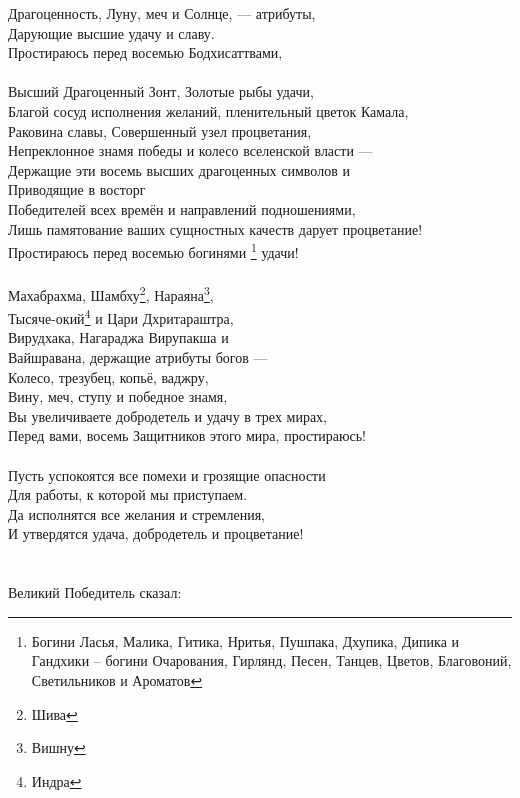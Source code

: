 Драгоценность, Луну, меч и Солнце, — атрибуты,\\
Дарующие высшие удачу и славу.\\
Простираюсь перед восемью Бодхисаттвами, \\
\\
Высший Драгоценный Зонт, Золотые рыбы удачи,\\
Благой сосуд исполнения желаний, пленительный цветок Камала,\\
Раковина славы, Совершенный узел процветания,\\
Непреклонное знамя победы и колесо вселенской власти —\\
Держащие эти восемь высших драгоценных символов  и\\
Приводящие в восторг \\ \indent Победителей всех времён и направлений подношениями,\\
Лишь памятование ваших сущностных качеств дарует процветание!\\
Простираюсь перед восемью богинями
\footnote{ Богини Ласья, Малика, Гитика, Нритья, Пушпака, 
           Дхупика, Дипика и Гандхики – богини Очарования, 
           Гирлянд, Песен, Танцев, Цветов, Благовоний, 
           Светильников и Ароматов} удачи! \\
\\
Махабрахма, Шамбху\footnote{Шива}, Нараяна\footnote{Вишну},\\
Тысяче-окий\footnote{Индра} и Цари Дхритараштра,\\
Вирудхака, Нагараджа Вирупакша и\\
Вайшравана, держащие атрибуты богов —\\
Колесо, трезубец, копьё, ваджру,\\
Вину, меч, ступу и победное знамя,\\
Вы увеличиваете добродетель и удачу в трех мирах,\\
Перед вами, восемь Защитников этого мира, простираюсь!\\
\\
\newpage
Пусть успокоятся все помехи и грозящие опасности\\
Для работы, к которой мы приступаем.\\
Да исполнятся все желания и стремления,\\
И утвердятся удача, добродетель и процветание!\\
\\
\vspace{1cm}
\\
\scriptsize
Великий Победитель сказал:
